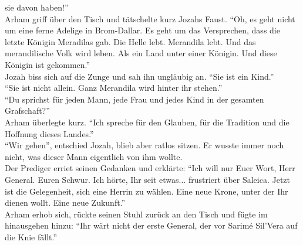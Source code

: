 sie davon haben!''\\
Arham griff über den Tisch und tätschelte kurz Jozahs Faust. ``Oh, es geht nicht um eine ferne 
Adelige in Brom-Dallar. Es geht um das Versprechen, dass die letzte Königin Meradilas gab. Die 
Helle lebt. Merandila lebt. Und das merandilische Volk wird leben. Als ein Land unter einer 
Königin. Und diese Königin ist gekommen.''\\
Jozah biss sich auf die Zunge und sah ihn ungläubig an. ``Sie ist ein Kind.''\\
``Sie ist nicht allein. Ganz Merandila wird hinter ihr stehen.''\\
``Du sprichst für jeden Mann, jede Frau und jedes Kind in der gesamten Grafschaft?''\\
Arham überlegte kurz. ``Ich spreche für den Glauben, für die Tradition und die Hoffnung dieses 
Landes.''\\
``Wir gehen'', entschied Jozah, blieb aber ratlos sitzen. Er wusste immer noch nicht, was dieser 
Mann eigentlich von ihm wollte.\\
Der Prediger erriet seinen Gedanken und erklärte: ``Ich will nur Euer Wort, Herr General. Euren 
Schwur. Ich hörte, Ihr seit etwas... frustriert über Saleica. Jetzt ist die Gelegenheit, sich eine 
Herrin zu wählen. Eine neue Krone, unter der Ihr dienen wollt. Eine neue Zukunft.''\\ Arham erhob 
sich, rückte seinen Stuhl zurück an den Tisch und fügte im hinausgehen hinzu: ``Ihr wärt nicht der 
erste General, der vor Sarimé Sil'Vera auf die Knie fällt.''\\